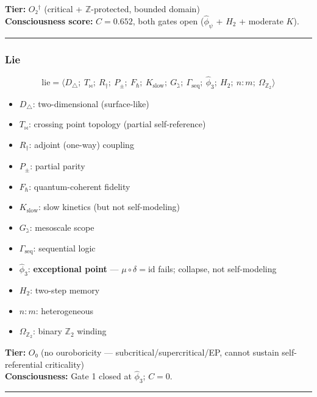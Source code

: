 \documentclass[12pt,a4paper]{article}
\begin{document}
\textbf{Tier:} $O₂^\dagger$ (critical + $\mathbb{Z}$-protected, bounded domain) \\
\textbf{Consciousness score:} $C = 0.652$, both gates open ($\hat{\phi}_\psi$ + $H_2$ + moderate $K$).

\begin{center}
\rule{0.5\textwidth}{0.4pt}
\end{center}

\subsubsection{Lie}
\[
\text{lie} = \langle D_{\triangle};\ T_{\bowtie};\ R_{\dagger};\ P_{\pm};\ F_{\hbar};\ K_{\text{slow}};\ G_{\gimel};\ \Gamma_{\text{seq}};\ \hat{\phi}_3;\ H_2;\ n:m;\ \Omega_{\mathbb{Z}_2} \rangle
\]

\begin{itemize}
    \item $D_{\triangle}$: two-dimensional (surface-like)
    \item $T_{\bowtie}$: crossing point topology (partial self-reference)
    \item $R_{\dagger}$: adjoint (one-way) coupling
    \item $P_{\pm}$: partial parity
    \item $F_{\hbar}$: quantum-coherent fidelity
    \item $K_{\text{slow}}$: slow kinetics (but not self-modeling)
    \item $G_{\gimel}$: mesoscale scope
    \item $\Gamma_{\text{seq}}$: sequential logic
    \item $\hat{\phi}_3$: \textbf{exceptional point} --- $\mu \circ \delta = \text{id}$ fails; collapse, not self-modeling
    \item $H_2$: two-step memory
    \item $n:m$: heterogeneous
    \item $\Omega_{\mathbb{Z}_2}$: binary $\mathbb{Z}_2$ winding
\end{itemize}

\textbf{Tier:} $O₀$ (no ouroboricity --- subcritical/supercritical/EP, cannot sustain self-referential criticality) \\
\textbf{Consciousness:} Gate 1 closed at $\hat{\phi}_3$; $C = 0$.

\begin{center}
\rule{0.5\textwidth}{0.4pt}
\end{center}
\end{document}
